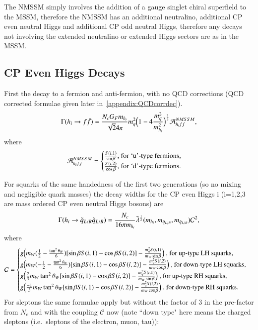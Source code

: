\documentclass[final,3p,times]{elsarticle}
\begin{document}
The NMSSM simply involves the addition of a gauge singlet chiral superfield to the MSSM, therefore the NMSSM has an additional neutralino, additional CP even neutral Higgs and additional CP odd neutral Higgs, therefore any decays not involving the extended neutralino or extended Higgs sectors are as in the MSSM.

\subsection{CP Even Higgs Decays}

First the decay to a fermion and anti-fermion, with no QCD corrections (QCD corrected formulae given later in~\ref{appendix:QCDcorrdec}).
\begin{equation} \label{hiqqNMSSM}
\Gamma (h_i \rightarrow f \bar{f}) = {N_c G_F m_{h_i} \over \sqrt{2} 4 \pi} m_{q}^2 \Big(1-4{m_{q}^2 \over m_{h_i}^2}\Big)^{3 \over 2} \mathcal{A}_{h_i ff}^{NMSSM},
\end{equation}
where
\begin{equation}
\mathcal{A}_{h_i ff}^{NMSSM} = \begin{cases} {S(i,1) \over \sin\beta} $, for `u'-type fermions, $\\
											 {S(i,2) \over \cos\beta} $, for `d'-type fermions. $\\
								\end{cases}
\end{equation}

For squarks of the same handedness of the first two generations (so no mixing and negligible quark masses) the decay widths for the CP even Higgs i (i=1,2,3 are mass ordered CP even neutral Higgs bosons) are
\begin{equation} \label{hqLRqLRNMSSM}
\Gamma( h_{i} \rightarrow \tilde{q}_{L/R} \tilde{q}_{L/R} ) = {N_{c} \over 16\pi m_{h_i}} \tilde{\lambda}^{1 \over 2}(m_{{h}_i},m_{\tilde{q}_{L/R}},m_{\tilde{q}_{L/R}})\mathcal{C}^2,
\end{equation}
where
\begin{equation}
\mathcal{C} = \begin{cases} g\Big(m_{W}(\frac{1}{2}-{\tan^2 \theta_W \over 6})[\sin\beta S(i,1) - \cos\beta S(i,2)] - {m_{q}^2 S(i,1) \over m_{W} \sin\beta}\Big) $ , for up-type LH squarks,$ \\
							g\Big(m_{W}(-\frac{1}{2}-{\tan^2 \theta_W \over 6})[\sin\beta S(i,1) - \cos\beta S(i,2)] - {m_{q}^2 S(i,2) \over m_{W} \cos\beta}\Big) $ , for down-type LH squarks,$ \\
							g\Big({2 \over 3}m_{W}\tan^2 \theta_W[\sin\beta S(i,1) - \cos\beta S(i,2)] - {m_{q}^2 S(i,1) \over m_{W} \sin\beta}\Big) $ , for up-type RH squarks,$ \\
							g\Big({-1 \over 3}m_{W}\tan^2 \theta_W[\sin\beta S(i,1) - \cos\beta S(i,2)] - {m_{q}^2 S(i,2) \over m_{W} \cos\beta}\Big) $ , for down-type RH squarks$. \\
							\end{cases}
\end{equation}
For sleptons the same formulae apply but without the factor of 3 in the pre-factor from $N_{c}$ and with the coupling $\mathcal{C}$ now (note ``down type" here means the charged sleptons (i.e.\ sleptons of the electron, muon, tau)):
\end{document}
